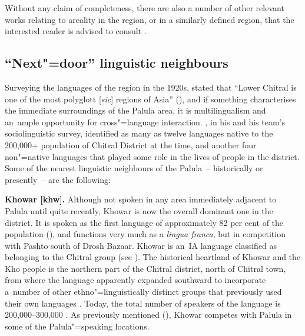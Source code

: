 Without any claim of completeness, there are also a number of other relevant works relating to areality in the region, or in a similarly defined region, that the interested reader is advised to consult \citep{bashir1988,bashir1996b,edelman1980,edelman1983,fussman1972,skalmowski1974,tikkanen1999,toporov1970}.


\subsection{``Next"=door'' linguistic neighbours}
\label{subsec:1-3-3}

Surveying the languages of the region in the 1920s, \citeauthor{morgenstierne1941} stated that ``Lower Chitral is one of the most polyglott [\textit{sic}] regions of Asia'' (\citeyear[7]{morgenstierne1941}), and if something characterises the immediate surroundings of the Palula area, it is multilingualism and an~ample opportunity for cross"=language interaction. \citet[10--23]{decker1992a}, in his and his team's sociolinguistic survey, identified as many as twelve languages native to the 200,000+ population of Chitral District at the time, and another four non"=native languages that played some role in the lives of people in the district. Some of the nearest linguistic neighbours of the Palula~-- historically or presently~-- are the following:


\textbf{Khowar [khw].}
Although not spoken in any area immediately adjacent to Palula until quite recently, Khowar is now the overall dominant one in the district. It is spoken as the first language of approximately 82 per cent of the population (\citealt[11]{decker1992a}), and functions very much as a \textit{lingua franca}, but in competition with Pashto south of Drosh Bazaar. Khowar is an~IA language classified as belonging to the Chitral group (see ). The historical heartland of Khowar and the Kho people is the northern part of the Chitral district, north of Chitral town, from where the language apparently expanded southward to incorporate a~number of other ethno"=linguistically distinct groups that previously used their own languages \citep[46--47]{morgenstierne1932}. Today, the total number of speakers of the language is 200,000--300,000 \citep[31--32]{decker1992a}. As previously mentioned (), Khowar competes with Palula in some of the Palula"=speaking locations.


